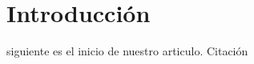 \section{Introducción}
 siguiente es el inicio de nuestro articulo. Citación~\cite{10.1145/2335755.2335846} 